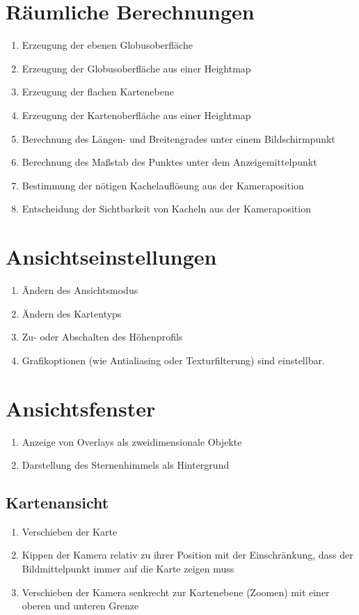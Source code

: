 \documentclass[10pt]{scrreprt}
\newcommand{\ziel}[1]{{\fontsize{9.5}{11}\textsf{/#1/}}}
\newcommand{\ziellabel}{Z}
\newcommand{\wunsch}{\renewcommand{\labelenumi}{\textbf{\ziel{\ziellabel\numprint{\theenumi}0W}}}}
\begin{document}
\section{Räumliche Berechnungen}
\begin{enumerate}[leftmargin=2.2cm,resume]
\item Erzeugung der ebenen Globusoberfläche
\item Erzeugung der Globusoberfläche aus einer Heightmap
\item Erzeugung der flachen Kartenebene
\item Erzeugung der Kartenoberfläche aus einer Heightmap
\item Berechnung des Längen- und Breitengrades unter einem Bildschirmpunkt
\item Berechnung des Maßstab des Punktes unter dem Anzeigemittelpunkt
\item Bestimmung der nötigen Kachelauflösung aus der Kameraposition
\item Entscheidung der Sichtbarkeit von Kacheln aus der Kameraposition
\wunsch
\end{enumerate}

\section{Ansichtseinstellungen}
\begin{enumerate}[leftmargin=2.2cm,resume]
\item Ändern des Ansichtsmodus
\item Ändern des Kartentyps
\wunsch
\item Zu- oder Abschalten des Höhenprofils
\item Grafikoptionen (wie Antialiasing oder Texturfilterung) sind einstellbar.
\end{enumerate}

\section{Ansichtsfenster}
\begin{enumerate}[leftmargin=2.2cm,resume]
\item Anzeige von Overlays als zweidimensionale Objekte
\item Darstellung des Sternenhimmels als Hintergrund
\end{enumerate}

\subsection{Kartenansicht}
\begin{enumerate}[leftmargin=2.2cm,resume]
\item Verschieben der Karte 
\item Kippen der Kamera relativ zu ihrer Position mit der Einschränkung, dass der Bildmittelpunkt immer auf die Karte zeigen muss
\item Verschieben der Kamera senkrecht zur Kartenebene (Zoomen) mit einer oberen und unteren Grenze
\end{enumerate}
\end{document}
